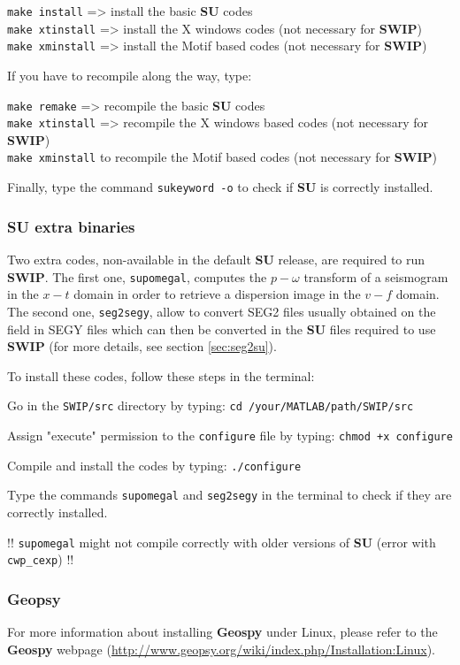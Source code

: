 \documentclass[twoside,a4paper]{article}
\def\SWIP{\textbf{SWIP}}
\def\SU{\textbf{SU}}
\def\Geopsy{\textbf{Geospy}}
\begin{document}
\verb|make install| => install the basic {\SU} codes\\
\verb|make xtinstall| => install the X windows codes (not necessary for {\SWIP})\\
\verb|make xminstall| => install the Motif based codes (not necessary for {\SWIP})

If you have to recompile along the way, type:

\verb|make remake| => recompile the basic {\SU} codes\\
\verb|make xtinstall| => recompile the X windows based codes (not necessary for {\SWIP})\\
\verb|make xminstall| to recompile the Motif based codes (not necessary for {\SWIP})

Finally, type the command \verb|sukeyword -o| to check if {\SU} is correctly installed.

\subsubsection{SU extra binaries}
Two extra codes, non-available in the default {\SU} release, are required to run {\SWIP}. The first one, \verb|supomegal|, computes the $p-\omega$ transform of a seismogram in the $x-t$ domain in order to retrieve a dispersion image in the $v-f$ domain. The second one, \verb|seg2segy|, allow to convert SEG2 files usually obtained on the field in SEGY files which can then be converted in the {\SU} files required to use {\SWIP} (for more details, see section \ref{sec:seg2su}).

To install these codes, follow these steps in the terminal:

Go in the \verb|SWIP/src| directory by typing: \verb|cd /your/MATLAB/path/SWIP/src|

Assign "execute" permission to the \verb|configure| file by typing: \verb|chmod +x configure|

Compile and install the codes by typing: \verb|./configure|

Type the commands \verb|supomegal| and \verb|seg2segy| in the terminal to check if they are correctly installed.

!! \verb|supomegal| might not compile correctly with older versions of {\SU} (error with \verb|cwp_cexp|) !!

\subsubsection{Geopsy}
For more information about installing {\Geopsy} under Linux, please refer to the {\Geopsy} webpage (\url{http://www.geopsy.org/wiki/index.php/Installation:Linux}).
\end{document}
